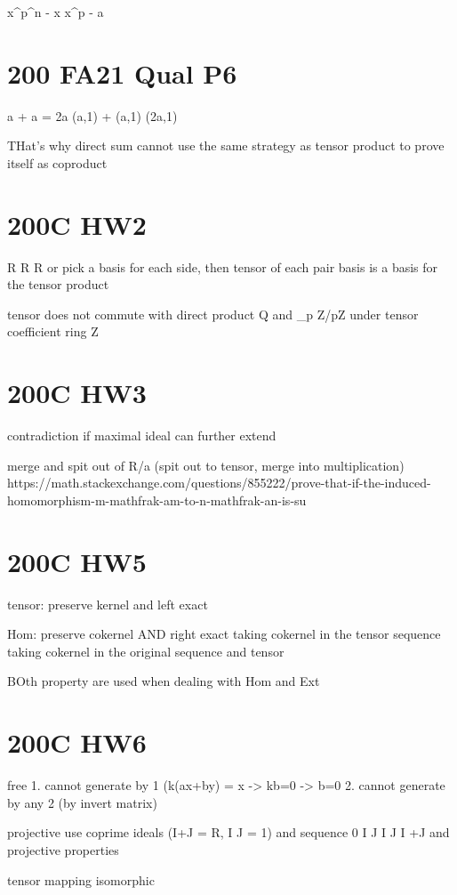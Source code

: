 {{{{{{{	x^{p^n} - x
	x^p - a
		

\section*{200 FA21 Qual P6}
a  + a  = 2a 
(a,1) + (a,1) \neq (2a,1)

THat's why direct sum cannot use the same strategy as tensor product to prove itself as coproduct


\section*{200C HW2}
R \otimes R \cong R
or pick a basis for each side, then tensor of each pair basis is a basis for the tensor product

tensor does not commute with direct product
	Q and \prod_p Z/pZ under tensor coefficient ring Z
	
\section*{200C HW3}

contradiction if maximal ideal can further extend

merge and spit out of R/a (spit out to tensor, merge into multiplication)
https://math.stackexchange.com/questions/855222/prove-that-if-the-induced-homomorphism-m-mathfrak-am-to-n-mathfrak-an-is-su

\section*{200C HW5}
tensor: preserve kernel and left exact

Hom: preserve cokernel AND right exact
	taking cokernel in the tensor sequence \cong taking cokernel in the original sequence and tensor
	
BOth property are used when dealing with Hom and Ext
\section*{200C HW6}

free
	1. cannot generate by 1 (k(ax+by) = x -> kb=0 -> b=0
	2. cannot generate by any 2 (by invert matrix)

projective
	use coprime ideals (I+J = R, I \cap J = 1)
	and sequence 0 \to I \cap J \to I \oplus J \to I +J  
	and projective properties


tensor mapping isomorphic
 
}}}}}}}
